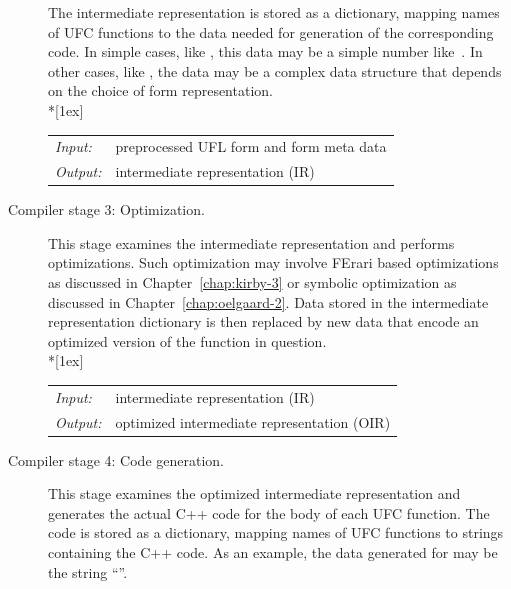 \begin{description}
  The intermediate representation is stored as a dictionary, mapping
  names of UFC functions to the data needed for generation of the
  corresponding code. In simple cases, like ,
  this data may be a simple number like~. In other cases,
  like , the data may be a
  complex data structure that depends on the choice of form
  representation. \\*[1ex]
  \begin{tabular}{ll}
    \emph{Input:}  & preprocessed UFL form and form meta data \\
    \emph{Output:} & intermediate representation (IR)
  \end{tabular}
\item[Compiler stage 3: Optimization.]
  This stage examines the intermediate representation and performs
  optimizations. Such optimization may involve FErari based
  optimizations as discussed in Chapter~\ref{chap:kirby-3} or symbolic
  optimization as discussed in Chapter~\ref{chap:oelgaard-2}.
  Data stored in the
  intermediate representation dictionary is then replaced by new data
  that encode an optimized version of the function in question. \\*[1ex]
  \begin{tabular}{ll}
    \emph{Input:}  & intermediate representation (IR) \\
    \emph{Output:} & optimized intermediate representation (OIR)
  \end{tabular}
\item[Compiler stage 4: Code generation.]
  This stage examines the optimized intermediate representation and
  generates the actual C++ code for the body of each UFC function. The
  code is stored as a dictionary, mapping names of UFC functions to
  strings containing the C++ code. As an example, the data generated for
   may be the string ``''.


\end{description}
